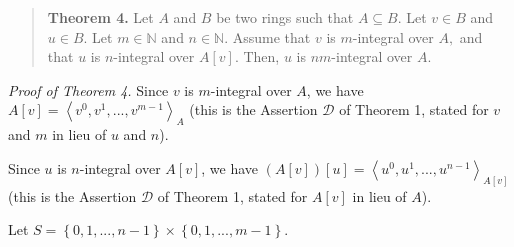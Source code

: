 \documentclass[12pt,final,notitlepage,onecolumn]{article}%
\begin{document}
\begin{quote}
\textbf{Theorem 4.} Let $A$ and $B$ be two rings such that $A\subseteq B$. Let
$v\in B$ and $u\in B$. Let $m\in\mathbb{N}$ and $n\in\mathbb{N}$. Assume that
$v$ is $m$-integral over $A,$ and that $u$ is $n$-integral over $A\left[
v\right]  $. Then, $u$ is $nm$-integral over $A$.
\end{quote}

\textit{Proof of Theorem 4.} Since $v$ is $m$-integral over $A$, we have
$A\left[  v\right]  =\left\langle v^{0},v^{1},...,v^{m-1}\right\rangle _{A}$
(this is the Assertion $\mathcal{D}$ of Theorem 1, stated for $v$ and $m$ in
lieu of $u$ and $n$).

Since $u$ is $n$-integral over $A\left[  v\right]  $, we have $\left(
A\left[  v\right]  \right)  \left[  u\right]  =\left\langle u^{0}%
,u^{1},...,u^{n-1}\right\rangle _{A\left[  v\right]  }$ (this is the Assertion
$\mathcal{D}$ of Theorem 1, stated for $A\left[  v\right]  $ in lieu of $A$).

Let $S=\left\{  0,1,...,n-1\right\}  \times\left\{  0,1,...,m-1\right\}  $.
\end{document}
